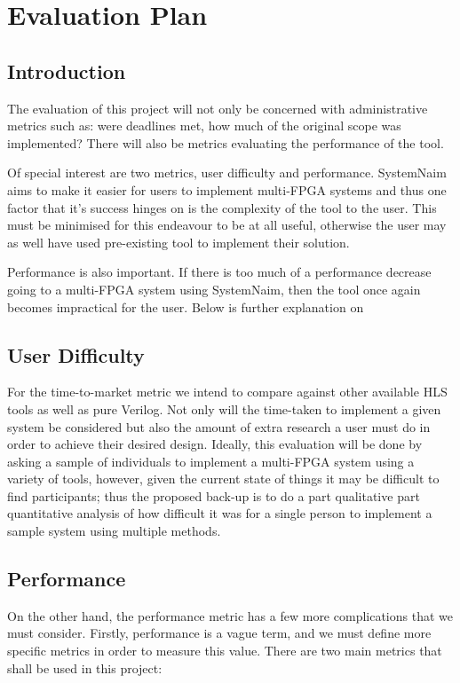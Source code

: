 \chapter{Evaluation Plan}
\label{chap:Eval}

\section{Introduction}
The evaluation of this project will not only be concerned with administrative metrics such as: were deadlines met, how much of the original scope was implemented? There will also be metrics evaluating the performance of the tool.

Of special interest are two metrics, user difficulty and performance. SystemNaim aims to make it easier for users to implement multi-FPGA systems and thus one factor that it's success hinges on is the complexity of the tool to the user. This must be minimised for this endeavour to be at all useful, otherwise the user may as well have used pre-existing tool to implement their solution.

Performance is also important. If there is too much of a performance decrease going to a multi-FPGA system using SystemNaim, then the tool once again becomes impractical for the user. Below is further explanation on 

\section{User Difficulty}
For the time-to-market metric we intend to compare against other available HLS tools as well as pure Verilog. Not only will the time-taken to implement a given system be considered but also the amount of extra research a user must do in order to achieve their desired design. Ideally, this evaluation will be done by asking a sample of individuals to implement a multi-FPGA system using a variety of tools, however, given the current state of things it may be difficult to find participants; thus the proposed back-up is to do a part qualitative part quantitative analysis of how difficult it was for a single person to implement a sample system using multiple methods.

\section{Performance}
On the other hand, the performance metric has a few more complications that we must consider. Firstly, performance is a vague term, and we must define more specific metrics in order to measure this value. There are two main metrics that shall be used in this project: 


